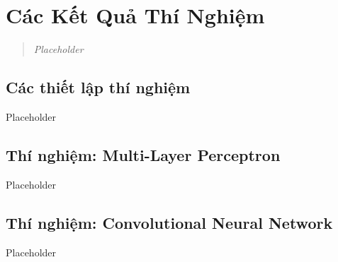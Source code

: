 \chapter{Các Kết Quả Thí Nghiệm}
\ifpdf
    \graphicspath{{Chapter4/Chapter4Figs/PNG/}{Chapter4/Chapter4Figs/PDF/}{Chapter4/Chapter4Figs/}}
\else
    \graphicspath{{Chapter4/Chapter4Figs/EPS/}{Chapter4/Chapter4Figs/}}
\fi
\label{chap_4}
\begin{quote}
\textit{Placeholder}
\end{quote}
\section{Các thiết lập thí nghiệm}
Placeholder
\section{Thí nghiệm: Multi-Layer Perceptron}
Placeholder
\section{Thí nghiệm: Convolutional Neural Network}
Placeholder